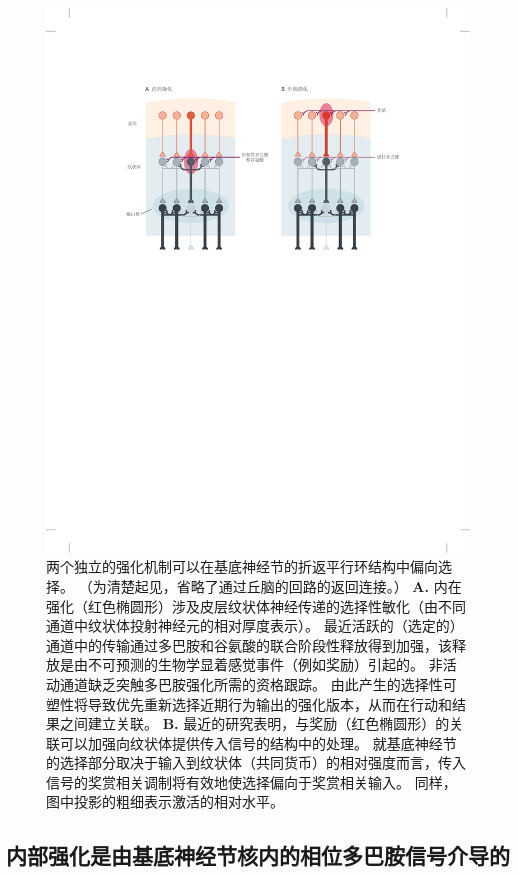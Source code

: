 \begin{figure}[htbp]
	\centering
	\includegraphics[width=0.96\linewidth]{chap38/fig_38_8}
	\caption{两个独立的强化机制可以在基底神经节的折返平行环结构中偏向选择。
		（为清楚起见，省略了通过丘脑的回路的返回连接。）
		\textbf{A.} 内在强化（红色椭圆形）涉及皮层纹状体神经传递的选择性敏化（由不同通道中纹状体投射神经元的相对厚度表示）。
		最近活跃的（选定的）通道中的传输通过多巴胺和谷氨酸的联合阶段性释放得到加强，该释放是由不可预测的生物学显着感觉事件（例如奖励）引起的。
		非活动通道缺乏突触多巴胺强化所需的资格跟踪。
		由此产生的选择性可塑性将导致优先重新选择近期行为输出的强化版本，从而在行动和结果之间建立关联。
		\textbf{B.} 最近的研究表明，与奖励（红色椭圆形）的关联可以加强向纹状体提供传入信号的结构中的处理。
		就基底神经节的选择部分取决于输入到纹状体（共同货币）的相对强度而言，传入信号的奖赏相关调制将有效地使选择偏向于奖赏相关输入。
		同样，图中投影的粗细表示激活的相对水平。}
	\label{fig:38_8}
\end{figure}



\subsection{内部强化是由基底神经节核内的相位多巴胺信号介导的}

